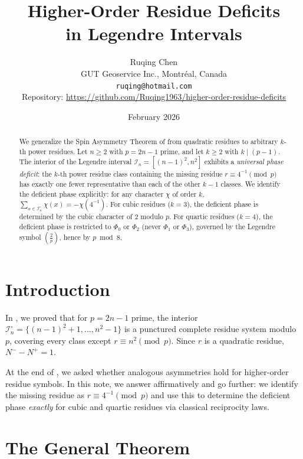 \documentclass[11pt, a4paper]{article}
\title{\textbf{Higher-Order Residue Deficits \\
in Legendre Intervals}}
\author{Ruqing Chen\\[4pt]
\small GUT Geoservice Inc., Montr\'eal, Canada\\[2pt]
\small \texttt{ruqing@hotmail.com}\\[2pt]
\small Repository:
\url{https://github.com/Ruqing1963/higher-order-residue-deficits}}
\date{February 2026}
\theoremstyle{definition}
\theoremstyle{remark}
\newcommand{\Leg}[2]{\left(\frac{#1}{#2}\right)}
\begin{document}
\maketitle

\begin{abstract}
We generalize the Spin Asymmetry Theorem of \cite{ChenSpin}
from quadratic residues to arbitrary $k$-th power residues.
Let $n \ge 2$ with $p = 2n - 1$ prime, and let $k \ge 2$
with $k \mid (p-1)$.
The interior of the Legendre interval
$\mathcal{I}_n = [(n-1)^2, n^2]$
exhibits a \emph{universal phase deficit}:
the $k$-th power residue class containing the
missing residue $r \equiv 4^{-1} \pmod{p}$
has exactly one fewer representative than each of the
other $k - 1$ classes.
We identify the deficient phase explicitly:
for any character $\chi$ of order $k$,
$\sum_{x \in \mathcal{I}_n^\circ} \chi(x) = -\chi(4^{-1})$.
For cubic residues ($k = 3$),
the deficient phase is determined by the cubic
character of $2$ modulo $p$.
For quartic residues ($k = 4$),
the deficient phase is restricted to $\Phi_0$ or $\Phi_2$
(never $\Phi_1$ or $\Phi_3$), governed by the
Legendre symbol $\Leg{2}{p}$, hence by $p \bmod 8$.
\end{abstract}

\bigskip

\section{Introduction}\label{sec:intro}

In \cite{ChenSpin}, we proved that
for $p = 2n - 1$ prime, the interior
$\mathcal{I}_n^\circ = \{(n-1)^2 + 1, \ldots, n^2 - 1\}$
is a punctured complete residue system modulo $p$,
covering every class except $r \equiv n^2 \pmod{p}$.
Since $r$ is a quadratic residue, $N^- - N^+ = 1$.

At the end of \cite{ChenSpin}, we asked whether
analogous asymmetries hold for higher-order residue symbols.
In this note, we answer affirmatively and go further:
we identify the missing residue as
$r \equiv 4^{-1} \pmod{p}$ and use this to determine
the deficient phase \emph{exactly} for cubic and quartic
residues via classical reciprocity laws.

\section{The General Theorem}\label{sec:theorem}
\end{document}
